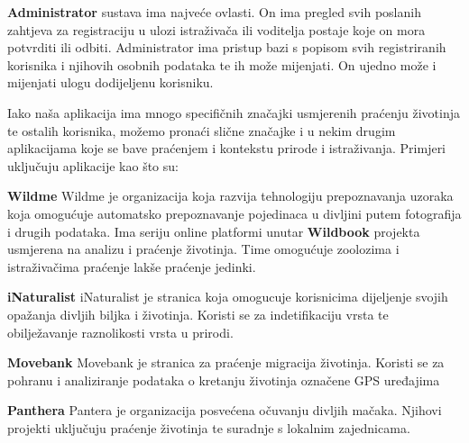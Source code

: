 		\textbf{Administrator} sustava ima najveće ovlasti. On ima pregled svih poslanih zahtjeva za registraciju u ulozi istraživača ili voditelja postaje koje on mora potvrditi ili odbiti. Administrator ima pristup bazi s popisom svih registriranih korisnika i njihovih osobnih podataka te ih može mijenjati. On ujedno može i mijenjati ulogu dodijeljenu korisniku.
\vspace{12pt}

		Iako naša aplikacija ima mnogo specifičnih značajki usmjerenih praćenju životinja te ostalih korisnika, možemo pronaći slične značajke i u nekim drugim aplikacijama koje se bave praćenjem i kontekstu prirode i istraživanja. Primjeri uključuju aplikacije kao što su:
		
		\begin{packed_item}
		
			\item \textbf{Wildme}\linebreak
			Wildme je organizacija koja razvija tehnologiju prepoznavanja uzoraka koja omogućuje automatsko prepoznavanje pojedinaca u divljini putem fotografija i drugih podataka. Ima seriju online platformi unutar \textbf{Wildbook} projekta usmjerena na analizu i praćenje životinja. Time omogućuje zoolozima i istraživačima praćenje lakše praćenje jedinki.
\vspace{12pt}
			
			\item \textbf{iNaturalist}\linebreak
			iNaturalist je stranica koja omogucuje korisnicima dijeljenje svojih opažanja divljih biljka i životinja. Koristi se za indetifikaciju vrsta te obilježavanje raznolikosti vrsta u prirodi.
\vspace{12pt}
			
			\item \textbf{Movebank}\linebreak
			Movebank je stranica za praćenje migracija životinja. Koristi se za pohranu i analiziranje podataka o kretanju životinja označene GPS uređajima
\vspace{12pt}
			
			\item \textbf{Panthera}\linebreak
			Pantera je organizacija posvećena očuvanju divljih mačaka. Njihovi projekti uključuju praćenje životinja te suradnje s lokalnim zajednicama.
			
		\end{packed_item}
		
